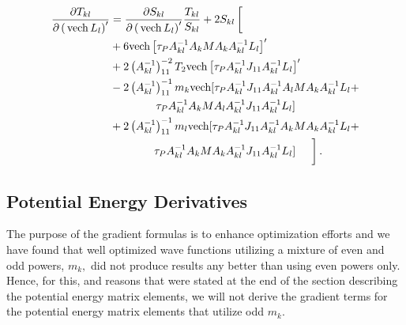 \documentclass[12pt]{article}
\begin{document}
\begin{align}
\frac{\partial T_{kl}}{\partial\left(  \,\mathrm{vech}\,L_{l}\right)
^{\prime}} &  =\frac{\partial S_{kl}}{\partial\left(  \,\mathrm{vech}%
\,L_{l}\right)  ^{\prime}}\frac{T_{kl}}{S_{kl}}+2S_{kl}\left[
\begin{array}
[c]{c}%
\,\\
\,
\end{array}
\right.  \nonumber\\
&  +6\mathrm{vech}\left[  \tau_{P}A_{kl}^{-1}A_{k}MA_{k}A_{kl}^{-1}%
L_{l}\right]  ^{\prime}\nonumber\\
&  +2\left(  A_{kl}^{-1}\right)  _{11}^{-2}T_{2}\mathrm{vech}\left[  \tau
_{P}A_{kl}^{-1}J_{11}A_{kl}^{-1}L_{l}\right]  ^{\prime}\nonumber\\
&  -2\left(  A_{kl}^{-1}\right)  _{11}^{-1}m_{k}\mathrm{vech[}\tau_{P}%
A_{kl}^{-1}J_{11}A_{kl}^{-1}A_{l}MA_{k}A_{kl}^{-1}L_{l}+\nonumber\\
&  \quad\quad\quad\,\quad\tau_{P}A_{kl}^{-1}A_{k}MA_{l}A_{kl}^{-1}J_{11}%
A_{kl}^{-1}L_{l}]\nonumber\\
&  +2\left(  A_{kl}^{-1}\right)  _{11}^{-1}m_{l}\mathrm{vech[}\tau_{P}%
A_{kl}^{-1}J_{11}A_{kl}^{-1}A_{k}MA_{k}A_{kl}^{-1}L_{l}+\nonumber\\
&  \quad\quad\quad\quad\tau_{P}A_{kl}^{-1}A_{k}MA_{k}A_{kl}^{-1}J_{11}%
A_{kl}^{-1}L_{l}]\left.
\begin{array}
[c]{c}%
\,\\
\,
\end{array}
\right]  .
\end{align}

\subsection{Potential Energy Derivatives}

The purpose of the gradient formulas is to enhance optimization efforts and we
have found that well optimized wave functions utilizing a mixture of even and
odd powers, $m_{k},$ did not produce results any better than using even powers
only. Hence, for this, and reasons that were stated at the end of the section
describing the potential energy matrix elements, we will not derive the
gradient terms for the potential energy matrix elements that utilize odd
$m_{k}.$
\end{document}
